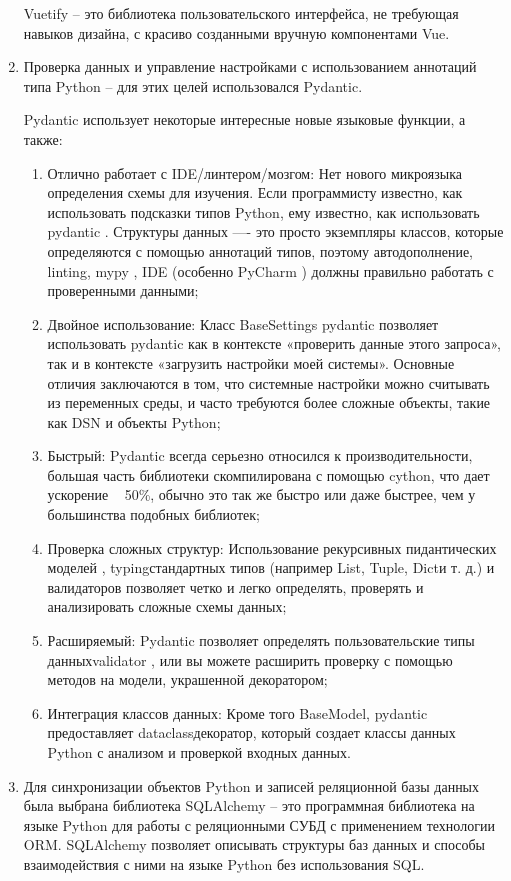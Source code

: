 \documentclass{altsu-report}
\begin{document}
\begin{enumerate}
    Vuetify -- это библиотека пользовательского интерфейса, не требующая навыков дизайна, с красиво созданными вручную компонентами Vue.

    \item Проверка данных и управление настройками с использованием аннотаций типа Python -- для этих целей использовался Pydantic.

    Pydantic использует некоторые интересные новые языковые функции, а также:
    
    \begin{enumerate}
        \item Отлично работает с IDE/линтером/мозгом: Нет нового микроязыка определения схемы для изучения. Если программисту известно, как использовать подсказки типов Python, ему известно, как использовать pydantic . Структуры данных —- это просто экземпляры классов, которые определяются с помощью аннотаций типов, поэтому автодополнение, linting, mypy , IDE (особенно PyCharm ) должны правильно работать с проверенными данными;
        \item Двойное использование: Класс BaseSettings pydantic позволяет использовать pydantic как в контексте «проверить данные этого запроса», так и в контексте «загрузить настройки моей системы». Основные отличия заключаются в том, что системные настройки можно считывать из переменных среды, и часто требуются более сложные объекты, такие как DSN и объекты Python;
        \item Быстрый: Pydantic всегда серьезно относился к производительности, большая часть библиотеки скомпилирована с помощью cython, что дает ускорение ~ 50\%, обычно это так же быстро или даже быстрее, чем у большинства подобных библиотек;
        \item Проверка сложных структур: Использование рекурсивных пидантических моделей , typingстандартных типов (например List, Tuple, Dictи т. д.) и валидаторов позволяет четко и легко определять, проверять и анализировать сложные схемы данных;
        \item Расширяемый: Pydantic позволяет определять пользовательские типы данныхvalidator , или вы можете расширить проверку с помощью методов на модели, украшенной декоратором;
        \item Интеграция классов данных: Кроме того BaseModel, pydantic предоставляет dataclassдекоратор, который создает классы данных Python с анализом и проверкой входных данных.
    \end{enumerate}

    \item Для синхронизации объектов Python и записей реляционной базы данных была выбрана библиотека SQLAlchemy -- это программная библиотека на языке Python для работы с реляционными СУБД с применением технологии ORM. SQLAlchemy позволяет описывать структуры баз данных и способы взаимодействия с ними на языке Python без использования SQL.
    

\end{enumerate}
\end{document}
